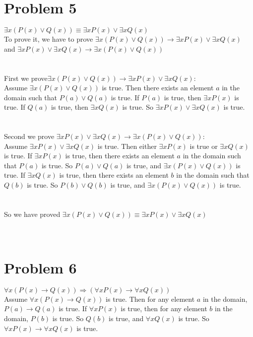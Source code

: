 \documentclass{article}
\begin{document}
\section{Problem 5}
$\exists x (P(x) \vee Q(x)) \equiv \exists x P(x) \vee \exists x Q(x)$\\
To prove it, we have to prove $\exists x (P(x) \vee Q(x)) \rightarrow \exists x P(x) \vee \exists x Q(x)$ and $\exists x P(x) \vee \exists x Q(x) \rightarrow \exists x (P(x) \vee Q(x))$\\
\\ \hspace*{\fill} \\
First we prove$\exists x (P(x) \vee Q(x)) \rightarrow \exists x P(x) \vee \exists x Q(x)$: \\
Assume $\exists x (P(x) \vee Q(x))$ is true. Then there exists an element $a$ in the domain such that $P(a) \vee Q(a)$ is true. If $P(a)$ is true, then $\exists x P(x)$ is true. If $Q(a)$ is true, then $\exists x Q(x)$ is true. So $\exists x P(x) \vee \exists x Q(x)$ is true.\\
\\ \hspace*{\fill} \\
Second we prove $\exists x P(x) \vee \exists x Q(x) \rightarrow \exists x (P(x) \vee Q(x))$: \\
Assume $\exists x P(x) \vee \exists x Q(x)$ is true. Then either $\exists x P(x)$ is true or $\exists x Q(x)$ is true. If $\exists x P(x)$ is true, then there exists an element $a$ in the domain such that $P(a)$ is true. So $P(a) \vee Q(a)$ is true, and $\exists x (P(x) \vee Q(x))$ is true. If $\exists x Q(x)$ is true, then there exists an element $b$ in the domain such that $Q(b)$ is true. So $P(b) \vee Q(b)$ is true, and $\exists x (P(x) \vee Q(x))$ is true.\\
\\ \hspace*{\fill} \\
So we have proved $\exists x (P(x) \vee Q(x)) \equiv \exists x P(x) \vee \exists x Q(x)$ \\
\\ \hspace*{\fill} \\
\section{Problem 6}
$\forall x (P(x) \rightarrow Q(x)) \Rightarrow (\forall x P(x) \rightarrow \forall x Q(x))$\\
Assume $\forall x (P(x) \rightarrow Q(x))$ is true. Then for any element $a$ in the domain, $P(a) \rightarrow Q(a)$ is true. If $\forall x P(x)$ is true, then for any element $b$ in the domain, $P(b)$ is true. So $Q(b)$ is true, and $\forall x Q(x)$ is true. So $\forall x P(x) \rightarrow \forall x Q(x)$ is true.\\
\\ \hspace*{\fill} \\
\end{document}
